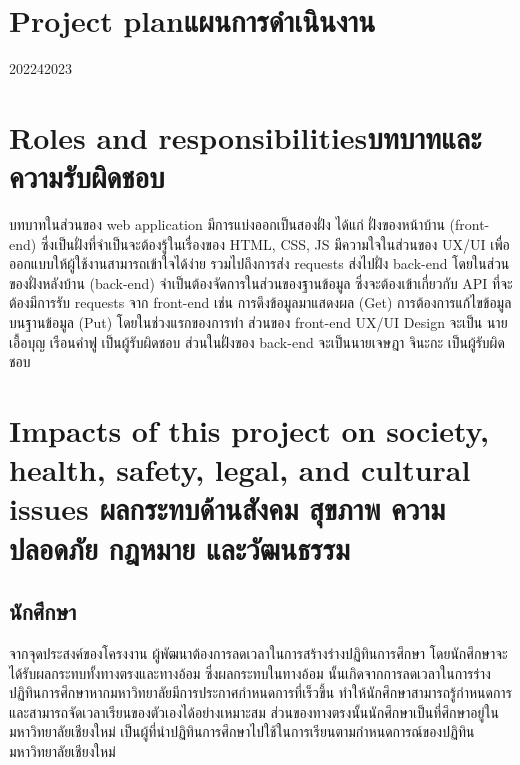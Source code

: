 \pagebreak
\section{\ifenglish Project plan\else แผนการดำเนินงาน\fi}
\begin{plan}{1}{2022}{4}{2023}
\end{plan}


\section{\ifenglish Roles and responsibilities\else บทบาทและความรับผิดชอบ\fi}
บทบาทในส่วนของ web application มีการแบ่งออกเป็นสองฝั่ง ได้แก่ 
%
ฝั่งของหน้าบ้าน (front-end) ซึ่งเป็นฝั่งที่จำเป็นจะต้องรู้ในเรื่องของ HTML, CSS, JS มีความใจในส่วนของ UX/UI เพื่อออกแบบให้ผู้ใช้งานสามารถเข้าใจได้ง่าย 
%
รวมไปถึงการส่ง requests ส่งไปฝั่ง back-end โดยในส่วนของฝั่งหลังบ้าน (back-end) จำเป็นต้องจัดการในส่วนของฐานข้อมูล ซึ่งจะต้องเข้าเกี่ยวกับ API 
%
ที่จะต้องมีการรับ requests จาก front-end เช่น การดึงข้อมูลมาแสดงผล (Get) การต้องการแก้ไขข้อมูลบนฐานข้อมูล (Put)  
%
โดยในช่วงแรกของการทำ ส่วนของ front-end UX/UI Design จะเป็น นายเอื้อบุญ เรือนคำฟู เป็นผู้รับผิดชอบ  
%
ส่วนในฝั่งของ back-end จะเป็นนายเจษฎา จินะกะ เป็นผู้รับผิดชอบ
\section{\ifenglish%
Impacts of this project on society, health, safety, legal, and cultural issues
\else%
ผลกระทบด้านสังคม สุขภาพ ความปลอดภัย กฎหมาย และวัฒนธรรม
\fi}

\subsection{นักศึกษา}
    จากจุดประสงค์ของโครงงาน ผู้พัฒนาต้องการลดเวลาในการสร้างร่างปฏิทินการศึกษา โดยนักศึกษาจะได้รับผลกระทบทั้งทางตรงและทางอ้อม ซึ่งผลกระทบในทางอ้อม
%
นั้นเกิดจากการลดเวลาในการร่างปฏิทินการศึกษาหากมหาวิทยาลัยมีการประกาศกำหนดการที่เร็วขึ้น ทำให้นักศึกษาสามารถรู้กำหนดการและสามารถจัดเวลาเรียนของตัวเองได้อย่างเหมาะสม 
%
ส่วนของทางตรงนั้นนักศึกษาเป็นที่ศึกษาอยู่ในมหาวิทยาลัยเชียงใหม่ เป็นผู้ที่นำปฏิทินการศึกษาไปใช้ในการเรียนตามกำหนดการณ์ของปฏิทิน มหาวิทยาลัยเชียงใหม่

